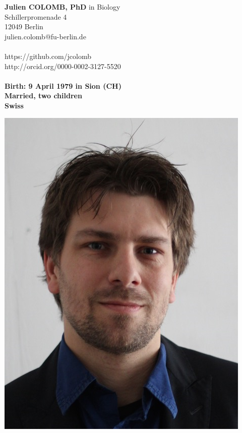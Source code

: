 \begin{minipage}[t]{\textwidth}
    \begin{minipage}[b]{0.5\textwidth}
        \textbf{Julien COLOMB, PhD} in Biology\\
        Schillerpromenade 4\\
        12049 Berlin\\
        julien.colomb@fu-berlin.de\\
         \\
        https://github.com/jcolomb\\
         http://orcid.org/0000-0002-3127-5520\\
         \\
   
        \textbf{Birth: 9 April 1979 in Sion (CH)}\\
        \textbf{Married, two children}\\
        \textbf{Swiss}
         
    \end{minipage}\hfill
    \begin{minipage}[b]{0.5\textwidth}
        \begin{flushright}
            \includegraphics[scale=0.3] {figures/photo_CV.png}
        \end{flushright}
    \end{minipage}
\end{minipage}\\

